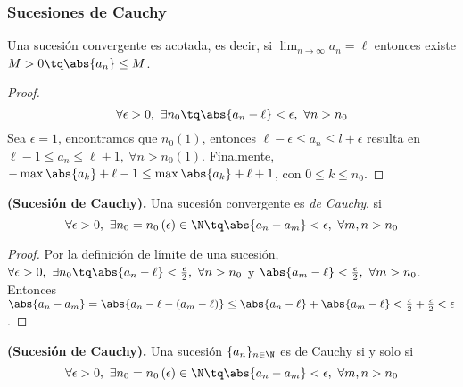 \subsubsection{Sucesiones de Cauchy}
\begin{lemma}
    Una sucesión convergente es acotada, es decir, si $\lim_{n\to\infty} a_n = \ell$ entonces existe $M > 0 \tq \abs{a_n} \leq M$.
\end{lemma}
\begin{proof}
    \begin{equation}
        \forall\epsilon > 0,\ \exists n_0\tq \abs{a_n - \ell} < \epsilon,\ \forall n > n_0
    \end{equation}
    Sea $\epsilon = 1$, encontramos que $n_0\left( 1 \right)$, entonces $\ell - \epsilon \leq a_n\leq l + \epsilon$ resulta en $\ell - 1 \leq a_n \leq \ell + 1,\ \forall n > n_0\left( 1 \right) $. Finalmente, $-\max\abs{a_k}+ \ell - 1\leq \max\abs{a_k} + \ell + 1$, con $0\leq k\leq n_0$.
\end{proof}
\begin{lemma}
    \textbf{(Sucesión de Cauchy).} Una sucesión convergente es \textit{de Cauchy}, si 
    \begin{equation}
        \forall\epsilon > 0,\ \exists n_0 = n_0\left( \epsilon \right) \in\N\tq \abs{a_n - a_m} < \epsilon,\ \forall m, n > n_0
    \end{equation}
\end{lemma}
\begin{proof}
    Por la definición de límite de una sucesión, $\forall\epsilon > 0,\ \exists n_0 \tq \abs{a_n - \ell} < \frac{\epsilon}{2},\ \forall n > n_0$ y $\abs{a_m - \ell} < \frac{\epsilon}{2},\ \forall m > n_0$.
    Entonces $\abs{a_n - a_m} = \abs{a_n - \ell - \left( a_m - \ell \right) }\leq \abs{a_n - \ell} + \abs{a_m - \ell} < \frac{\epsilon}{2} + \frac{\epsilon}{2} < \epsilon$.
\end{proof}
\begin{definition}
    \textbf{(Sucesión de Cauchy).} Una sucesión $\{a_n\}_{n\in\N} $ es de Cauchy si y solo si
    \begin{equation}
        \forall\epsilon > 0,\ \exists n_0 = n_0\left( \epsilon \right) \in\N\tq \abs{a_n - a_m} < \epsilon,\ \forall m, n > n_0
    \end{equation}
\end{definition}
